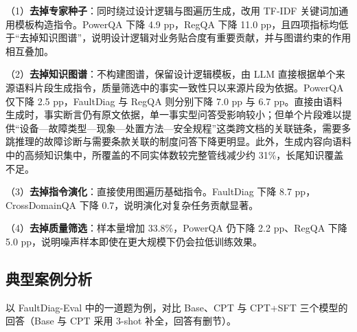 \documentclass[fontset=fandol,type=master,campus=shenzhen,etitleauto=true]{hithesisbook}
\begin{document}
（1）\textbf{去掉专家种子}：同时绕过设计逻辑与图遍历生成，改用 TF-IDF 关键词加通用模板构造指令。PowerQA 下降 4.9 pp，RegQA 下降 11.0 pp，且四项指标均低于“去掉知识图谱”，说明设计逻辑对业务贴合度有重要贡献，并与图谱约束的作用相互叠加。

（2）\textbf{去掉知识图谱}：不构建图谱，保留设计逻辑模板，由 LLM 直接根据单个来源语料片段生成指令，质量筛选中的事实一致性只以来源片段为依据。PowerQA 仅下降 2.5 pp，FaultDiag 与 RegQA 则分别下降 7.0 pp 与 6.7 pp。直接由语料生成时，事实断言仍有原文依据，单一事实型问答受影响较小；但单个片段难以提供“设备—故障类型—现象—处置方法—安全规程”这类跨文档的关联链条，需要多跳推理的故障诊断与需要条款关联的制度问答下降更明显。此外，生成内容向语料中的高频知识集中，所覆盖的不同实体数较完整管线减少约 31\%，长尾知识覆盖不足。

（3）\textbf{去掉指令演化}：直接使用图遍历基础指令。FaultDiag 下降 8.7 pp，CrossDomainQA 下降 0.7，说明演化对复杂任务贡献显著。

（4）\textbf{去掉质量筛选}：样本量增加 33.8\%，PowerQA 仍下降 2.2 pp、RegQA 下降 5.0 pp，说明噪声样本即使在更大规模下仍会拉低训练效果。

\begin{table}[htbp]
\centering
\caption{SFT数据合成管线消融实验结果}
\label{tab:sft-ablation}
\small
{}
\end{table}

\subsection{典型案例分析}\label{subsec:sft-case}

以 FaultDiag-Eval 中的一道题为例，对比 Base、CPT 与 CPT+SFT 三个模型的回答（Base 与 CPT 采用 3-shot 补全，回答有删节）。
\end{document}
